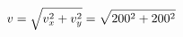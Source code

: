 \documentclass[preview]{standalone}
\begin{document}
\begin{align*}
\special{dvisvgm:raw <g id='unique000'>}v = \sqrt{v_x^2 + v_y^2} = \sqrt{200^2 + 200^2}\special{dvisvgm:raw </g>}
\end{align*}
\end{document}
